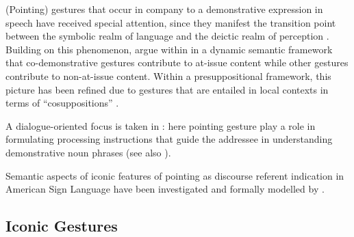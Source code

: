 \documentclass[output=paper]{langsci/langscibook}
\begin{document}
(Pointing) gestures that occur in company to a demonstrative expression in speech have received special attention, since they manifest the transition point between the symbolic realm of language and the deictic realm of perception \citep{Levinson:2008,Fricke:2012}.
%
Building on this phenomenon, \citet{Ebert:2014:a,Ebert:Ebert:2016} argue within in a dynamic semantic framework that co-demonstrative gestures  contribute to at-issue content while other gestures %
contribute to non-at-issue content.
%
Within a presuppositional framework, this picture has been refined due to gestures that are entailed in local contexts in terms of \enquote{cosuppositions} \citet{Schlenker:2018}.


A dialogue-oriented focus is taken in \citet{Luecking:2018:a}: here pointing gesture play a role in formulating processing instructions that guide the addressee in understanding demonstrative noun phrases (see also ).  


Semantic aspects of iconic features of pointing as discourse referent indication in American Sign Language have been investigated and formally modelled by \citet{Schlenker:Lamberton:Santoro:2013,Schlenker:2014}.
 



\subsection{Iconic Gestures}
\label{sec:iconic-gestures}
\end{document}
